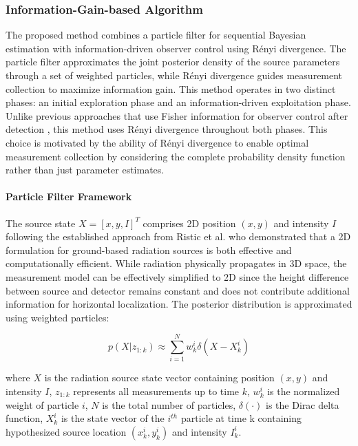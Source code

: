 \documentclass[../report.tex]{subfiles}
\begin{document}
    \subsubsection{Information-Gain-based Algorithm}

    The proposed method combines a particle filter for sequential Bayesian estimation with information-driven observer control using Rényi divergence. The particle filter approximates
    the joint posterior density of the source parameters through a set of weighted particles, while Rényi divergence guides measurement collection to maximize information gain. 
    This method operates in two distinct phases: an initial exploration phase and an information-driven exploitation phase. Unlike previous approaches that use Fisher information for observer control
    after detection \cite{Ristic2007AnIG}, this method uses Rényi divergence throughout both phases. This choice is motivated by the ability of Rényi divergence to enable optimal measurement collection 
    by considering the complete probability density function rather than just parameter estimates.

    \paragraph{Particle Filter Framework}
    The source state $X = [x, y, I]^T$ comprises 2D position $(x,y)$ and intensity $I$ following the established approach from Ristic et al. who demonstrated that a 2D formulation for ground-based 
    radiation sources is both effective and computationally efficient. While radiation physically propagates in 3D space, the measurement model can be effectively simplified to 2D since the height
    difference between source and detector remains constant and does not contribute additional information for horizontal localization. 
    The posterior distribution is approximated using weighted particles:

    \begin{equation}
    p(X|z_{1:k}) \approx \sum_{i=1}^N w_k^i \delta(X - X_k^i)
    \end{equation}

    where $X$ is the radiation source state vector containing position $(x,y)$ and intensity $I$, $z_{1:k}$ represents all measurements up to time $k$, $w_k^i$ is the normalized weight of 
    particle $i$, $N$ is the total number of particles, $\delta(\cdot)$ is the Dirac delta function, $X_k^i$ is the state vector of the $i^{th}$ particle at time k containing
    hypothesized source location $(x_k^i, y_k^i)$ and intensity $I_k^i$. 
\end{document}
